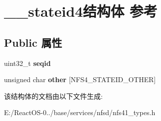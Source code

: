 \hypertarget{struct____stateid4}{}\section{\+\_\+\+\_\+stateid4结构体 参考}
\label{struct____stateid4}
\subsection*{Public 属性}
\begin{DoxyCompactItemize}
\item 
\mbox{\label{struct____stateid4_a915f89eb15ee30c58e5760b0f910a434}} 
uint32\+\_\+t {\bfseries seqid}
\item 
\mbox{\label{struct____stateid4_a69000539e343d858f7ab666a40bcb8fd}} 
unsigned char {\bfseries other} \mbox{[}N\+F\+S4\+\_\+\+S\+T\+A\+T\+E\+I\+D\+\_\+\+O\+T\+H\+ER\mbox{]}
\end{DoxyCompactItemize}


该结构体的文档由以下文件生成\+:\begin{DoxyCompactItemize}
\item 
E\+:/\+React\+O\+S-\/0../base/services/nfsd/nfs41\+\_\+types.\+h\end{DoxyCompactItemize}
